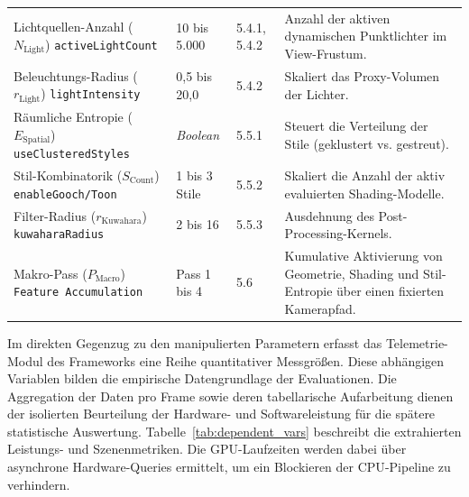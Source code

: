 \begin{table}[htbp]
\begin{tabularx}{\textwidth}{@{} >{\raggedright\arraybackslash}p{4.2cm} l l >{\raggedright\arraybackslash}X @{}}
        Lichtquellen-Anzahl ($N_{\text{Light}}$) \newline \scriptsize{\texttt{activeLightCount}}
        & 10 bis 5.000
        & 5.4.1, 5.4.2
        & Anzahl der aktiven dynamischen Punktlichter im View-Frustum. \\

        Beleuchtungs-Radius ($r_{\text{Light}}$) \newline \scriptsize{\texttt{lightIntensity}}
        & 0,5 bis 20,0
        & 5.4.2
        & Skaliert das Proxy-Volumen der Lichter. \\

        Räumliche Entropie ($E_{\text{Spatial}}$) \newline \scriptsize{\texttt{useClusteredStyles}}
        & \textit{Boolean}
        & 5.5.1
        & Steuert die Verteilung der Stile (geklustert vs. gestreut). \\

        Stil-Kombinatorik ($S_{\text{Count}}$) \newline \scriptsize{\texttt{enableGooch/Toon}}
        & 1 bis 3 Stile
        & 5.5.2
        & Skaliert die Anzahl der aktiv evaluierten Shading-Modelle. \\

        Filter-Radius ($r_{\text{Kuwahara}}$) \newline \scriptsize{\texttt{kuwaharaRadius}}
        & 2 bis 16
        & 5.5.3
        & Ausdehnung des Post-Processing-Kernels. \\

        Makro-Pass ($P_{\text{Macro}}$) \newline \scriptsize{\texttt{Feature Accumulation}}
        & Pass 1 bis 4
        & 5.6
        & Kumulative Aktivierung von Geometrie, Shading und Stil-Entropie über einen fixierten Kamerapfad. \\

        \bottomrule
    \end{tabularx}
\end{table}

Im direkten Gegenzug zu den manipulierten Parametern erfasst das Telemetrie-Modul des Frameworks eine Reihe
quantitativer Messgrößen.
Diese abhängigen Variablen bilden die empirische Datengrundlage der Evaluationen.
Die Aggregation der Daten pro Frame sowie deren tabellarische Aufarbeitung dienen der isolierten Beurteilung der
Hardware- und Softwareleistung für die spätere statistische Auswertung.
Tabelle~\ref{tab:dependent_vars} beschreibt die extrahierten Leistungs- und Szenenmetriken.
Die \ac{GPU}-Laufzeiten werden dabei über asynchrone Hardware-Queries ermittelt, um ein Blockieren der \ac{CPU}-Pipeline zu
verhindern.

